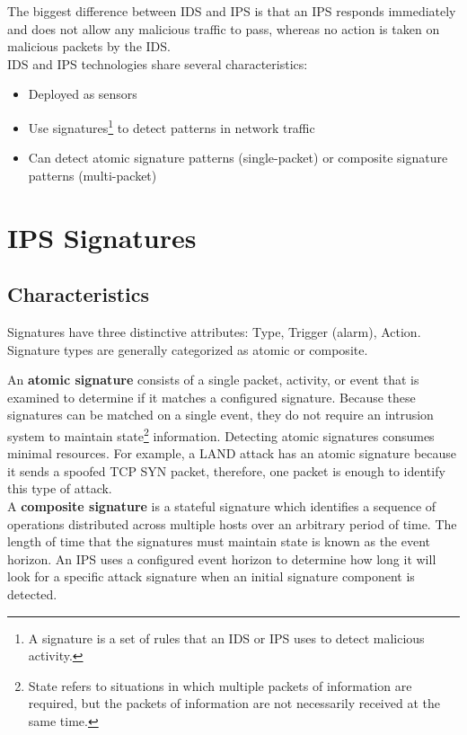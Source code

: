 The biggest difference between IDS and IPS is that an IPS responds immediately and does not allow any malicious traffic to pass, whereas no action is taken on malicious packets by the IDS.\\

IDS and IPS technologies share several characteristics:

\begin{itemize}
\item Deployed as sensors
\item Use signatures\footnote{A signature is a set of rules that an IDS or IPS uses to detect malicious activity.} to detect patterns in network traffic
\item Can detect atomic signature patterns (single-packet) or composite signature patterns (multi-packet)
\end{itemize}

\section{IPS Signatures}

\subsection{Characteristics}

Signatures have three distinctive attributes: Type, Trigger (alarm), Action. Signature types are generally categorized as atomic or composite.

An \textbf{atomic signature} consists of a single packet, activity, or event that is examined to determine if it matches a configured signature. Because these signatures can be matched on a single event, they do not require an intrusion system to maintain state\footnote{State refers to situations in which multiple packets of information are required, but the packets of information are not necessarily received at the same time.} information. Detecting atomic signatures consumes minimal resources. For example, a LAND attack has an atomic signature because it sends a spoofed TCP SYN packet, therefore, one packet is enough to identify this type of attack.\\

A \textbf{composite signature} is a stateful signature which identifies a sequence of operations distributed across multiple hosts over an arbitrary period of time. The length of time that the signatures must maintain state is known as the event horizon. An IPS uses a configured event horizon to determine how long it will look for a specific attack signature when an initial signature component is detected.\\

